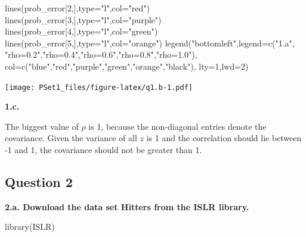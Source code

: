 \documentclass[
]{article}
\newenvironment{Shaded}{\begin{snugshade}}{\end{snugshade}}
\newcommand{\AttributeTok}[1]{\textcolor[rgb]{0.77,0.63,0.00}{#1}}
\newcommand{\DecValTok}[1]{\textcolor[rgb]{0.00,0.00,0.81}{#1}}
\newcommand{\FunctionTok}[1]{\textcolor[rgb]{0.00,0.00,0.00}{#1}}
\newcommand{\NormalTok}[1]{#1}
\newcommand{\StringTok}[1]{\textcolor[rgb]{0.31,0.60,0.02}{#1}}
\begin{document}
\begin{Shaded}
\begin{Highlighting}[]
\FunctionTok{lines}\NormalTok{(prob\_error[}\DecValTok{2}\NormalTok{,],}\AttributeTok{type=}\StringTok{"l"}\NormalTok{,}\AttributeTok{col=}\StringTok{"red"}\NormalTok{)}
\FunctionTok{lines}\NormalTok{(prob\_error[}\DecValTok{3}\NormalTok{,],}\AttributeTok{type=}\StringTok{"l"}\NormalTok{,}\AttributeTok{col=}\StringTok{"purple"}\NormalTok{)}
\FunctionTok{lines}\NormalTok{(prob\_error[}\DecValTok{4}\NormalTok{,],}\AttributeTok{type=}\StringTok{"l"}\NormalTok{,}\AttributeTok{col=}\StringTok{"green"}\NormalTok{)}
\FunctionTok{lines}\NormalTok{(prob\_error[}\DecValTok{5}\NormalTok{,],}\AttributeTok{type=}\StringTok{"l"}\NormalTok{,}\AttributeTok{col=}\StringTok{"orange"}\NormalTok{)}
\FunctionTok{legend}\NormalTok{(}\StringTok{"bottomleft"}\NormalTok{,}\AttributeTok{legend=}\FunctionTok{c}\NormalTok{(}\StringTok{"1.a"}\NormalTok{, }\StringTok{"rho=0.2"}\NormalTok{,}\StringTok{"rho=0.4"}\NormalTok{,}\StringTok{"rho=0.6"}\NormalTok{,}\StringTok{"rho=0.8"}\NormalTok{,}\StringTok{"rho=1.0"}\NormalTok{),}
       \AttributeTok{col=}\FunctionTok{c}\NormalTok{(}\StringTok{"blue"}\NormalTok{,}\StringTok{"red"}\NormalTok{,}\StringTok{"purple"}\NormalTok{,}\StringTok{"green"}\NormalTok{,}\StringTok{"orange"}\NormalTok{,}\StringTok{"black"}\NormalTok{), }\AttributeTok{lty=}\DecValTok{1}\NormalTok{,}\AttributeTok{lwd=}\DecValTok{2}\NormalTok{)}
\end{Highlighting}
\end{Shaded}

\texttt{[image: PSet1\_files/figure-latex/q1.b-1.pdf]}

\textbf{1.c.}

The biggest value of \(\rho\) is 1, because the non-diagonal entries
denote the covariance. Given the variance of all \(z\) is 1 and the
correlation should lie between -1 and 1, the covariance should not be
greater than 1.

\hypertarget{question-2}{%
\subsection{Question 2}\label{question-2}}

\textbf{2.a. Download the data set Hitters from the ISLR library.}

\begin{Shaded}
\begin{Highlighting}[]
\FunctionTok{library}\NormalTok{(ISLR)}
\end{Highlighting}
\end{Shaded}
\end{document}
